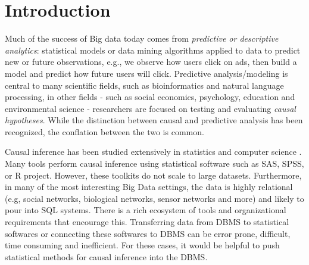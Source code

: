 \section{Introduction}
\label{sec:introduction}





Much of the success of Big data today comes from \emph{predictive or descriptive
  analytics}:  statistical models or data mining algorithms applied to data
to predict new or future observations, e.g., we observe
how users click on ads, then build a model and predict how future
users will click.  Predictive analysis/modeling is central to many scientific fields, such as
bioinformatics and natural language processing, in other  fields - such as social economics, psychology, education and environmental
science - researchers are focused on testing and evaluating {\em causal hypotheses}. While the distinction between causal
and predictive analysis has been recognized, the conflation between the two is common.


Causal inference has been studied extensively in statistics and
computer science \cite{Fisher1935design,Rubin2005,holland1986statistics,PearlBook2000,Spirtes:book01}.
Many tools perform causal inference
 using statistical software such as SAS, SPSS, or R project. However, these toolkits do not scale to large datasets.  Furthermore, in many of the most interesting Big Data settings, the data
is highly relational (e.g, social networks, biological networks, sensor networks and more) and likely to pour into SQL systems. There is a rich ecosystem of tools and organizational requirements that encourage this. Transferring
data from DBMS to statistical softwares or connecting these
softwares to DBMS can be error prone, difficult, time consuming and inefficient. For these
cases, it would be helpful to push statistical methods for causal inference into the DBMS.


